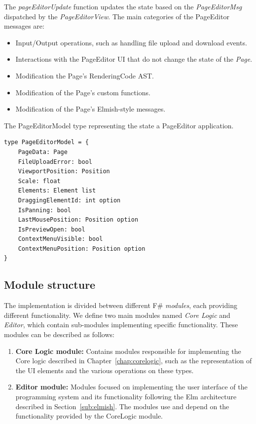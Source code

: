 The \emph{pageEditorUpdate} function updates the state based on the \emph{PageEditorMsg} dispatched by the \emph{PageEditorView}.
The main categories of the PageEditor messages are:
\begin{itemize}
	\item Input/Output operations, such as handling file upload and download events.
	\item Interactions with the PageEditor UI that do not change the state of the \emph{Page}.
	\item Modification the Page's RenderingCode AST.
	\item Modification of the Page's custom functions.
	\item Modification of the Page's Elmish-style messages.
\end{itemize}


\begin{listing}[htbp]
	\caption{The PageEditorModel type representing the state a PageEditor application.}
	\label{fig:editorModel}
	\begin{lstlisting}
type PageEditorModel = {
    PageData: Page
    FileUploadError: bool
    ViewportPosition: Position
    Scale: float
    Elements: Element list
    DraggingElementId: int option
    IsPanning: bool
    LastMousePosition: Position option
    IsPreviewOpen: bool
    ContextMenuVisible: bool
    ContextMenuPosition: Position option
}    
  \end{lstlisting}
\end{listing}

\subsection{Module structure}
The implementation is divided between different F\# \emph{modules}, each providing different functionality.
We define two main modules named \emph{Core Logic} and \emph{Editor}, which contain sub-modules implementing specific functionality.
These modules can be described as follows:
\begin{enumerate}
	\item \textbf{Core Logic module:} Contains modules responsible for implementing the Core logic described in Chapter~\ref{chap:corelogic}, such as the representation of the UI elements and the various operations on these types.
	\item \textbf{Editor module:} Modules focused on implementing the user interface of the programming system and its functionality following the Elm architecture described in Section~\ref{sub:elmish}.
	      The modules use and depend on the functionality provided by the CoreLogic module.
\end{enumerate}

